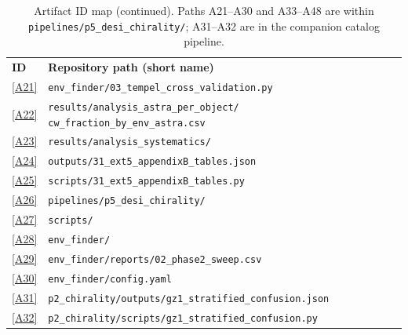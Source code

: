 \documentclass[twocolumn,linenumbers]{aastex702}
\newcommand{\repoBase}{https://github.com/Hubify-Projects/bigbounce/blob/main}
\begin{document}
\begin{table}[p]
{\small
\caption{Artifact ID map (continued). Paths A21--A30 and A33--A48 are
within \texttt{pipelines/p5\_desi\_chirality/}; A31--A32 are in the
companion catalog pipeline.}
\begin{ruledtabular}
\begin{tabular}{lp{}}
\textbf{ID} & \textbf{Repository path (short name)} \\
\colrule
\href{\repoBase/pipelines/p5\_desi\_chirality/env\_finder/03\_tempel\_cross\_validation.py}{[A21]} & \texttt{env\_finder/03\_tempel\_cross\_validation.py} \\
\href{\repoBase/pipelines/p5\_desi\_chirality/results/analysis\_astra\_per\_object/cw\_fraction\_by\_env\_astra.csv}{[A22]} & \texttt{results/analysis\_astra\_per\_object/} \texttt{cw\_fraction\_by\_env\_astra.csv} \\
\href{\repoBase/pipelines/p5\_desi\_chirality/results/analysis\_systematics/}{[A23]} & \texttt{results/analysis\_systematics/} \\
\href{\repoBase/pipelines/p5\_desi\_chirality/outputs/31\_ext5\_appendixB\_tables.json}{[A24]} & \texttt{outputs/31\_ext5\_appendixB\_tables.json} \\
\href{\repoBase/pipelines/p5\_desi\_chirality/scripts/31\_ext5\_appendixB\_tables.py}{[A25]} & \texttt{scripts/31\_ext5\_appendixB\_tables.py} \\
\href{\repoBase/pipelines/p5\_desi\_chirality/}{[A26]} & \texttt{pipelines/p5\_desi\_chirality/} \\
\href{\repoBase/pipelines/p5\_desi\_chirality/scripts/}{[A27]} & \texttt{scripts/} \\
\href{\repoBase/pipelines/p5\_desi\_chirality/env\_finder/}{[A28]} & \texttt{env\_finder/} \\
\href{\repoBase/pipelines/p5\_desi\_chirality/env\_finder/reports/02\_phase2\_sweep.csv}{[A29]} & \texttt{env\_finder/reports/02\_phase2\_sweep.csv} \\
\href{\repoBase/pipelines/p5\_desi\_chirality/env\_finder/config.yaml}{[A30]} & \texttt{env\_finder/config.yaml} \\
\href{\repoBase/pipelines/p2\_chirality/outputs/gz1\_stratified\_confusion.json}{[A31]} & \texttt{p2\_chirality/outputs/gz1\_stratified\_confusion.json} \\
\href{\repoBase/pipelines/p2\_chirality/scripts/gz1\_stratified\_confusion.py}{[A32]} & \texttt{p2\_chirality/scripts/gz1\_stratified\_confusion.py} \\

\end{tabular}
\end{ruledtabular}}
\end{table}
\end{document}
